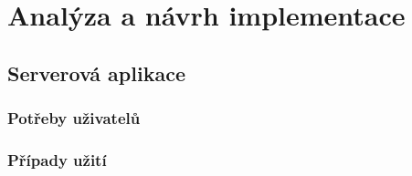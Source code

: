
\chapter{Analýza a návrh implementace}



% 
% 
% 

\section{Serverová aplikace}
\subsection{Potřeby uživatelů}

\subsection{Případy užití}

